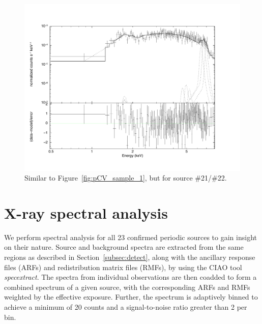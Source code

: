 \documentclass[fleqn,usenatbib]{mnras}
\begin{document}
\begin{figure}
\begin{minipage}[t]{0.45\textwidth}
\includegraphics[width=1.02\textwidth]{./figure/LW/153001_spec.pdf}
\end{minipage}
\caption{Similar to Figure~\ref{fig:pCV_sample_1}, but for source \#21/\#22.}
\label{fig:pCV_sample_2}
\end{figure}

\section{X-ray spectral analysis}\label{sec:spectra}
We perform spectral analysis for all 23 confirmed periodic sources to gain insight on their nature. Source and background spectra are extracted from the same regions as described in Section~\ref{subsec:detect}, along with the ancillary response files (ARFs) and redistribution matrix files (RMFs), by using the CIAO tool \emph{specextract}. 
The spectra from individual observations are then coadded to form a combined spectrum of a given source, with the corresponding ARFs and RMFs weighted by the effective exposure. 
Further, the spectrum is adaptively binned to achieve a minimum of 20 counts and a signal-to-noise ratio greater than 2 per bin.
\end{document}
